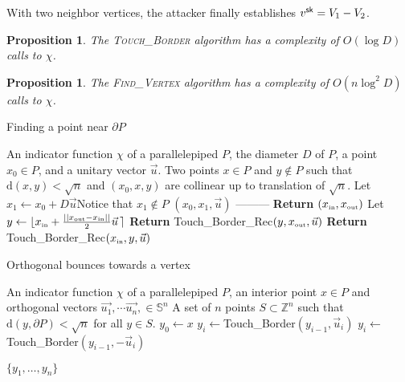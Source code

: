 \documentclass[11pt]{article}
\theoremstyle{plain}
\newtheorem{PROP}[THE]{Proposition}
\theoremstyle{definition}
\theoremstyle{remark}
\newcommand{\ZZ}{\mathbb{Z}}      %
\newcommand{\sk}{{\sf sk}}
\begin{document}
 
 With two neighbor vertices, the attacker finally establishes $v^\sk=V_1-V_2$.


\begin{PROP}
	\label{prop:touchborder}
	The \textsc{Touch\_Border} algorithm has a complexity of $O(\log D)$ calls to $\chi$.
\end{PROP}


\begin{PROP}
\label{prop:findvertex}
	The \textsc{Find\_Vertex} algorithm has a complexity of $O(n\log^2 D)$ calls to $\chi$.
\end{PROP}


\begin{algorithm}
	\caption{\label{algo:touch} Finding a point near $\partial P$}
	\begin{algorithmic}[1]
		\Require An indicator function $\chi$ of a parallelepiped $P$, the diameter $D$ of $P$, a point $x_0\in P$, and a unitary vector $\vec u$.
		\Ensure Two points $x\in P$ and $y\not\in P$ such that $\mathrm{d}(x,y)<\sqrt{n}$ and $(x_0,x,y)$ are collinear up to translation of $\sqrt{n}$. 
		\State Let $x_1\leftarrow x_0+D\vec u$\Comment Notice that $x_1\not\in P$
		\State {}$(x_0,x_1,\vec u)$
		\EndFunction 
		\Statex ---------
		\State \textbf{Return} $(x_{\mbox{\tiny in}},x_{\mbox{\tiny out}})$
		\Else \State Let $y\leftarrow \lfloor x_{\mbox{\tiny in}}+\frac{||x_{\mbox{\tiny out}}-x_{\mbox{\tiny in}}||}{2}\vec u\,\rceil $
		\State \textbf{Return} {\sc Touch\_Border\_Rec}$(y,x_{\mbox{\tiny out}},\vec u)$
		\Else 
		\State \textbf{Return} {\sc Touch\_Border\_Rec}$(x_{\mbox{\tiny in}},y,\vec u)$
		\EndIf
		\EndIf 
		\EndFunction
		\end{algorithmic}
		\end{algorithm}



\begin{algorithm}
	\caption{\label{algo:surface} Orthogonal bounces towards a vertex}
	\begin{algorithmic}[1]
		\Require An indicator function $\chi$ of a parallelepiped $P$, an interior point $x\in P$ and orthogonal vectors $\vec{u_1},\cdots \vec{u_n},\in \mathbb{S}^n$
		\Ensure A set of $n$ points $S\subset \ZZ^n$ such that $\mathrm{d}(y, \partial P) < \sqrt{n}$ for all $y\in S$.
		\State $y_0\leftarrow x$
		\State $y_i\leftarrow${\sc Touch\_Border}$(y_{i-1},\vec u_i)$
		\Else
		\State $y_i\leftarrow${\sc Touch\_Border}$(y_{i-1},-\vec u_i)$
		\EndIf

		\EndFor
		\State \Return $\{y_1,\dots,y_n\}$
		\EndFunction
	\end{algorithmic}
\end{algorithm}
\end{document}
